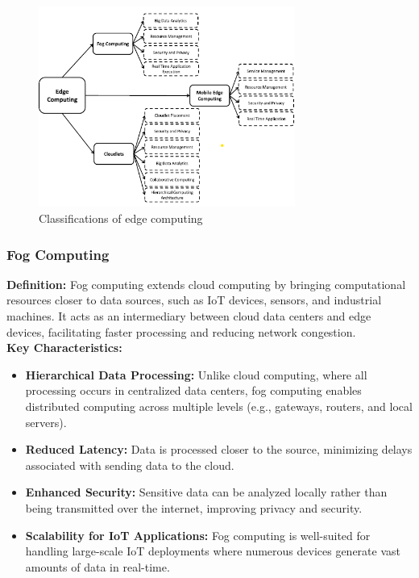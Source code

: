 \documentclass[runningheads]{llncs}
\begin{document}
\begin{figure}[ht]
    \centering
    \includegraphics[width=0.75\textwidth]{IMG/1.png}
    \caption{Classifications of edge computing}
    \label{fig:edge_classifications}
    \end{figure}
\FloatBarrier

\subsubsection{Fog Computing}
\textbf{Definition:}  
Fog computing extends cloud computing by bringing computational resources closer to data sources, such as IoT devices, sensors, and industrial machines. It acts as an intermediary between cloud data centers and edge devices, facilitating faster processing and reducing network congestion.
\\
\textbf{Key Characteristics:}
\begin{itemize}
    \item \textbf{Hierarchical Data Processing:} Unlike cloud computing, where all processing occurs in centralized data centers, fog computing enables distributed computing across multiple levels (e.g., gateways, routers, and local servers).
    \item \textbf{Reduced Latency:} Data is processed closer to the source, minimizing delays associated with sending data to the cloud.
    \item \textbf{Enhanced Security:} Sensitive data can be analyzed locally rather than being transmitted over the internet, improving privacy and security.
    \item \textbf{Scalability for IoT Applications:} Fog computing is well-suited for handling large-scale IoT deployments where numerous devices generate vast amounts of data in real-time.
\end{itemize}
\end{document}
